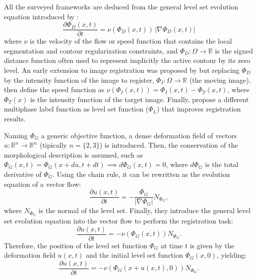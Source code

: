All the surveyed frameworks are deduced from the general level set evolution equation
introduced by \citep{osher_fronts_1988}:
\begin{equation}
\frac{\partial \Phi_D(x,t)}{\partial t} = \nu ( \Phi_D(x,t)) \, \left| \nabla \Phi_D(x,t) \right|
\end{equation}
where $\nu$ is the velocity of the flow or speed function that contains the local
segmentation and contour regularization constraints, and $\Phi_D: \Omega \to \mathbb{R}$
is the signed distance function often used to represent implicitly the active contour
by its zero level. An early extension to image registration was proposed by 
\citep{vemuri_joint_2003} but replacing $\Phi_D$ by the intensity function of the
image to register, $\Phi_I: \Omega \to \mathbb{R}$ (the moving image). 
\citep{bertalmio_morphing_2000,vemuri_joint_2003} then define the speed function as
$\nu(\Phi_I(x,t)) = \Phi_I(x,t) - \Phi_T(x,t)$, where $\Phi_T(x)$ is the intensity
function of the target image. Finally, \citep{gorthi_active_2011} propose a different
multiphase label function as level set function ($\Phi_L$) that improves registration
results.

Naming $\Phi_G$ a generic objective function, a dense deformation field of vectors 
$u: \mathbb{R}^n \to \mathbb{R}^n$ (tipically $n = \{ 2, 3 \}$) is introduced. 
Then, the conservation of the morphological description is assumed, such as
$\Phi_G(x,t) = \Phi_G( x + du, t + dt ) \implies d\Phi_G(x,t) = 0$, where $d\Phi_G$ is
the total derivative of $\Phi_G$. Using the chain rule, it can be rewritten as the 
evolution equation of a vector flow:
\begin{equation}
\frac{\partial u(x,t)}{\partial t}= - \frac{\Phi_G}{\left| \nabla \Phi_G \right|} N_{\Phi_G},
\end{equation}
where $N_{\Phi_G}$ is the normal of the level set. Finally, they introduce the general
level set evolution equation into the vector flow to perform the registration task:
\begin{equation}
\frac{\partial u(x,t)}{\partial t} = - \nu( \Phi_G(x,t) ) N_{\Phi_G}.
\end{equation}
Therefore, the position of the level set function $\Phi_G$ at time $t$ is given by the
deformation field $u(x,t)$ and the initial level set function $\Phi_G(x,0)$, yielding:
\begin{equation}
\frac{\partial u(x,t)}{\partial t} = - \nu( \Phi_G(x + u(x,t), 0) ) N_{\Phi_G}.
\end{equation}

